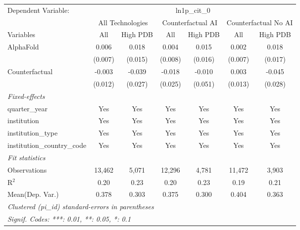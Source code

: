 \begingroup
\centering
\begin{tabular}{lcccccc}
   \tabularnewline \midrule \midrule
   Dependent Variable: & \multicolumn{6}{c}{ln1p\_cit\_0}\\
 & \multicolumn{2}{c}{All Technologies} & \multicolumn{2}{c}{Counterfactual AI} & \multicolumn{2}{c}{Counterfactual No AI} \\
\cmidrule(lr){1-1}\cmidrule(lr){2-3} \cmidrule(lr){4-5} \cmidrule(lr){6-7}
Variables & \multicolumn{1}{c}{All} & \multicolumn{1}{c}{High PDB} & \multicolumn{1}{c}{All} & \multicolumn{1}{c}{High PDB} & \multicolumn{1}{c}{All} & \multicolumn{1}{c}{High PDB} \\
\cmidrule(lr){1-1}\cmidrule(lr){2-2} \cmidrule(lr){3-3} \cmidrule(lr){4-4} \cmidrule(lr){5-5} \cmidrule(lr){6-6} \cmidrule(lr){7-7}
   AlphaFold                    & 0.006   & 0.018   & 0.004   & 0.015   & 0.002   & 0.018\\   
                                & (0.007) & (0.015) & (0.008) & (0.016) & (0.007) & (0.017)\\   
   Counterfactual               & -0.003  & -0.039  & -0.018  & -0.010  & 0.003   & -0.045\\   
                                & (0.012) & (0.027) & (0.025) & (0.051) & (0.013) & (0.028)\\   
   \midrule
   \emph{Fixed-effects}\\
   quarter\_year                & Yes     & Yes     & Yes     & Yes     & Yes     & Yes\\  
   institution                  & Yes     & Yes     & Yes     & Yes     & Yes     & Yes\\  
   institution\_type            & Yes     & Yes     & Yes     & Yes     & Yes     & Yes\\  
   institution\_country\_code   & Yes     & Yes     & Yes     & Yes     & Yes     & Yes\\  
   \midrule
   \emph{Fit statistics}\\
   Observations                 & 13,462  & 5,071   & 12,296  & 4,781   & 11,472  & 3,903\\  
   R$^2$                        & 0.20    & 0.23    & 0.20    & 0.23    & 0.19    & 0.21\\  
Mean(Dep. Var.) & 0.378 & 0.303 & 0.375 & 0.300 & 0.404 & 0.363 \\
   \midrule \midrule
   \multicolumn{7}{l}{\emph{Clustered (pi\_id) standard-errors in parentheses}}\\
   \multicolumn{7}{l}{\emph{Signif. Codes: ***: 0.01, **: 0.05, *: 0.1}}\\
\end{tabular}
\par\endgroup
